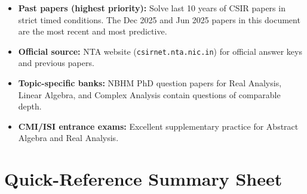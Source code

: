 \documentclass[12pt,a4paper]{article}
\begin{document}
\begin{itemize}[leftmargin=1.5em, itemsep=4pt]
  \item \textbf{Past papers (highest priority):} Solve last 10 years of CSIR papers in strict timed conditions. The Dec 2025 and Jun 2025 papers in this document are the most recent and most predictive.
  \item \textbf{Official source:} NTA website (\texttt{csirnet.nta.nic.in}) for official answer keys and previous papers.
  \item \textbf{Topic-specific banks:} NBHM PhD question papers for Real Analysis, Linear Algebra, and Complex Analysis contain questions of comparable depth.
  \item \textbf{CMI/ISI entrance exams:} Excellent supplementary practice for Abstract Algebra and Real Analysis.
\end{itemize}

\section{Quick-Reference Summary Sheet}
\end{document}
